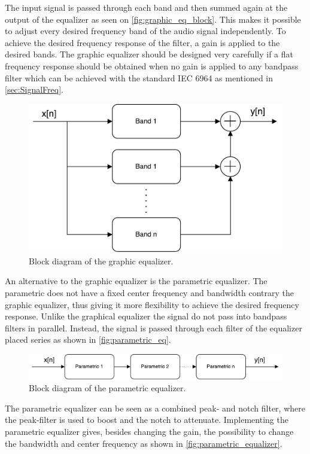 The input signal is passed through each band and then summed again at the output of the equalizer as seen on \autoref{fig:graphic_eq_block}. This makes it possible to adjust every desired frequency band of the audio signal independently. To achieve the desired frequency response of the filter, a gain is applied to the desired bands. The graphic equalizer should be designed very carefully if a flat frequency response should be obtained when no gain is applied to any bandpass filter which can be achieved with the standard IEC 6964 as mentioned in \autoref{sec:SignalFreq}.

\begin{figure}[H]
\centering
\includegraphics[width=0.6 \textwidth]{figures/graphic_eq_block.pdf}
\caption{Block diagram of the graphic equalizer.}
\label{fig:graphic_eq_block}
\end{figure}

An alternative to the graphic equalizer is the parametric equalizer. The parametric does not have a fixed center frequency and bandwidth contrary the graphic equalizer, thus giving it more flexibility to achieve the desired frequency response. Unlike the graphical equalizer the signal do not pass into bandpass filters in parallel. Instead, the signal is passed through each filter of the equalizer placed series as shown in \autoref{fig:parametric_eq}. \\

\begin{figure}[H]
\centering
\includegraphics[width=0.8 \textwidth]{figures/parametric_eq.pdf}
\caption{Block diagram of the parametric equalizer.}
\label{fig:parametric_eq}
\end{figure}

The parametric equalizer can be seen as a combined peak- and notch filter, where the peak-filter is used to boost and the notch to attenuate. Implementing the parametric equalizer gives, besides changing the gain, the possibility to change the bandwidth and center frequency as shown in \autoref{fig:parametric_equalizer}.

